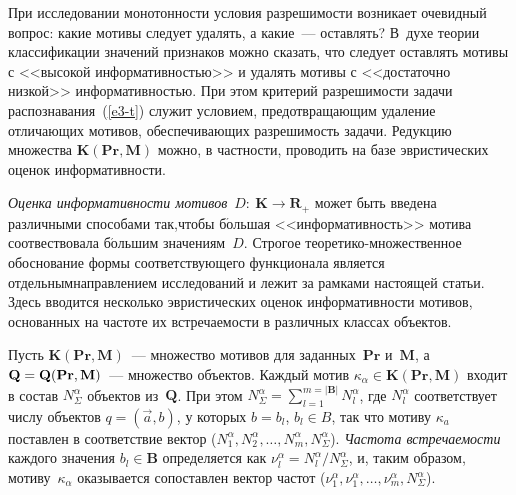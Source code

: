 \begin{multicols}{2}
При исследовании монотонности условия разрешимости возникает
очевидный вопрос: какие мотивы следует удалять, а какие~--- оставлять?
В~духе тео\-рии классификации значений признаков можно сказать, что
следует оставлять мотивы с <<высокой\linebreak
информативностью>> и удалять
мотивы с <<доста\-точ\-но низкой>> информативностью. При этом кри\-терий
разрешимости задачи распознавания~(\ref{e3-t}) \mbox{служит} усло\-ви\-ем,
предотвращающим удаление отличающих мотивов, обеспечивающих
разрешимость задачи. Редукцию множества $\mathbf{K}(\mathbf{Pr}, \mathbf{M})$ можно, в част\-ности,
проводить на базе эвристических оценок информативности.

\textit{Оценка информативности мотивов}~$D:\ \mathbf{K}\rightarrow
\mathbf{R}_+$ может быть введена различными способами так,\linebreak что\-бы
б$\acute{\mbox{о}}$льшая <<информативность>> мотива соотвествовала
б$\acute{\mbox{о}}$льшим значениям~$D$. Строгое
тео\-ре\-ти\-ко-мно\-же\-ст\-вен\-ное обоснование формы соответствующего
функционала является отдельным\linebreak направлением исследований и лежит за
рамками настоящей статьи. Здесь вводится несколько эвристических оценок
информативности мотивов, основанных на частоте их встречаемости в
различных классах объектов.

Пусть $\mathbf{K}(\mathbf{Pr}, \mathbf{M})$~--- множество мотивов для заданных~$\mathbf{Pr}$
и~$\mathbf{M}$, а $\mathbf{Q} \hm= \mathbf{Q}(\mathbf{Pr}, \mathbf{M})$~---
множество объектов. Каждый мотив $\kappa_\alpha\in  \mathbf{K}(\mathbf{Pr},
\mathbf{M})$ входит в состав $N_\Sigma^\alpha$ объектов из~$\mathbf{Q}$. При этом $N_\Sigma^\alpha
=\sum\limits_{l=1}^{m=\vert \mathbf{B}\vert} N_l^\alpha$, где $N_l^\alpha$ соответствует числу
объектов $q=(\vec{a},b)$, у которых $b=b_l$, $b_l\in B$, так что мотиву
$\kappa_a$ по\-став\-лен в соответствие вектор ($N_1^\alpha, N_2^\alpha, \ldots , N_m^\alpha,
N_\Sigma^\alpha$). \textit{Частота встречаемости} каждого значения $b_l\in \mathbf{B}$
определяется как $\nu_l^\alpha =N_l^\alpha/N_\Sigma^\alpha$, и, таким образом,
мотиву~$\kappa_\alpha$ оказывается сопоставлен вектор частот ($\nu_1^\alpha,
\nu_1^\alpha, \ldots , \nu_m^\alpha, N_\Sigma^\alpha$).


\end{multicols}
